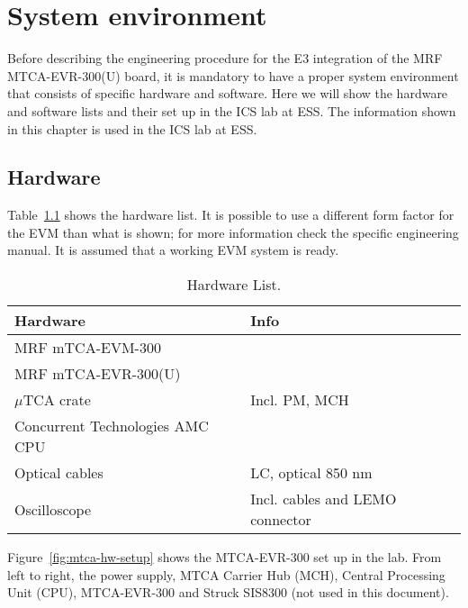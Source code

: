 \documentclass[11pt
  , a4paper
  , article
  , oneside
  , showtrims
]{memoir}
\begin{document}
\chapter{System environment}
Before describing the engineering procedure for the E3 integration of the MRF MTCA-EVR-300(U) board, it is mandatory to have a proper system environment that consists of specific hardware and software. Here we will show the hardware and software lists and their set up in the ICS lab at ESS. The information shown in this chapter is used in the ICS lab at ESS.\\


\section{Hardware}
Table~\ref{table:hwlist} shows the hardware list. It is possible to use a different form factor for the EVM than what is shown; for more information check the specific engineering manual. It is assumed that a working EVM system is ready.

\begin{table}[!hb]
  \centering
  \begin{tabular}{l|l}
    \toprule
    Hardware                        & Info                            \\\midrule
    MRF mTCA-EVM-300                &                                 \\\midrule
    MRF mTCA-EVR-300(U)             &                                 \\\midrule
    $\mu$TCA crate                  & Incl. PM, MCH                   \\\midrule
    Concurrent Technologies AMC CPU &                                 \\\midrule
    Optical cables                  & LC, optical 850 nm              \\\midrule
    Oscilloscope                    & Incl. cables and LEMO connector \\\bottomrule
  \end{tabular}
  \caption[]{Hardware List.}
  \label{table:hwlist}
\end{table}

Figure~\ref{fig:mtca-hw-setup} shows the MTCA-EVR-300 set up in the lab. From left to right, the power supply, MTCA Carrier Hub (MCH), Central Processing Unit (CPU), MTCA-EVR-300 and Struck SIS8300 (not used in this document).\\
\end{document}
